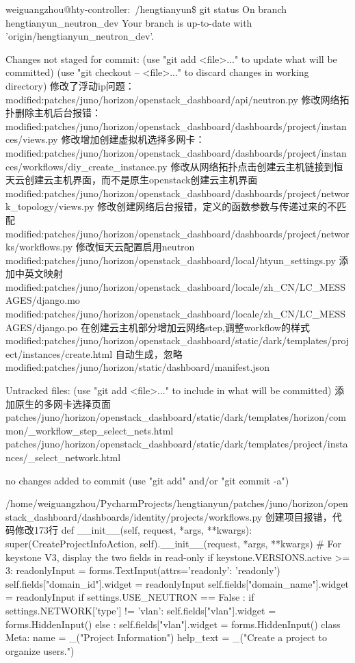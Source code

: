 weiguangzhou@hty-controller:~/hengtianyun\$ git status
On branch hengtianyun_neutron_dev
Your branch is up-to-date with 'origin/hengtianyun_neutron_dev'.

Changes not staged for commit:
  (use "git add <file>..." to update what will be committed)
  (use "git checkout -- <file>..." to discard changes in working directory)
    修改了浮动ip问题：
	modified:patches/juno/horizon/openstack_dashboard/api/neutron.py
    修改网络拓扑删除主机后台报错：
	modified:patches/juno/horizon/openstack_dashboard/dashboards/project/instances/views.py
	修改增加创建虚拟机选择多网卡：
    modified:patches/juno/horizon/openstack_dashboard/dashboards/project/instances/workflows/diy_create_instance.py
	修改从网络拓扑点击创建云主机链接到恒天云创建云主机界面，而不是原生openstack创建云主机界面
    modified:patches/juno/horizon/openstack_dashboard/dashboards/project/network_topology/views.py
    修改创建网络后台报错，定义的函数参数与传递过来的不匹配
	modified:patches/juno/horizon/openstack_dashboard/dashboards/project/networks/workflows.py
    修改恒天云配置启用neutron
	modified:patches/juno/horizon/openstack_dashboard/local/htyun_settings.py
    添加中英文映射
	modified:patches/juno/horizon/openstack_dashboard/locale/zh_CN/LC_MESSAGES/django.mo
	modified:patches/juno/horizon/openstack_dashboard/locale/zh_CN/LC_MESSAGES/django.po
	在创建云主机部分增加云网络step,调整workflow的样式
	modified:patches/juno/horizon/openstack_dashboard/static/dark/templates/project/instances/create.html
	自动生成，忽略
	modified:patches/juno/horizon/static/dashboard/manifest.json

Untracked files:
  (use "git add <file>..." to include in what will be committed)
    添加原生的多网卡选择页面
	patches/juno/horizon/openstack_dashboard/static/dark/templates/horizon/common/_workflow_step_select_nets.html
	patches/juno/horizon/openstack_dashboard/static/dark/templates/project/instances/_select_network.html

no changes added to commit (use "git add" and/or "git commit -a")





/home/weiguangzhou/PycharmProjects/hengtianyun/patches/juno/horizon/openstack_dashboard/dashboards/identity/projects/workflows.py
创建项目报错，代码修改173行
 def __init__(self, request, *args, **kwargs):
        super(CreateProjectInfoAction, self).__init__(request,
                                                      *args,
                                                      **kwargs)
        # For keystone V3, display the two fields in read-only
        if keystone.VERSIONS.active >= 3:
            readonlyInput = forms.TextInput(attrs={'readonly': 'readonly'})
            self.fields["domain_id"].widget = readonlyInput
            self.fields["domain_name"].widget = readonlyInput
        if settings.USE_NEUTRON == False :
            if settings.NETWORK['type'] != 'vlan':
                self.fields["vlan"].widget = forms.HiddenInput()
        else :
            self.fields["vlan"].widget = forms.HiddenInput()
    class Meta:
        name = _("Project Information")
        help_text = _("Create a project to organize users.")

